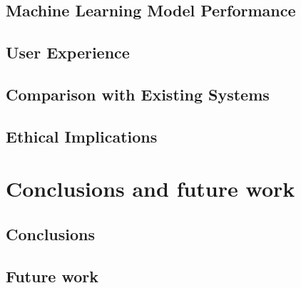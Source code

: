       \subsection{Machine Learning Model Performance}
    
      \subsection{User Experience}
    
      \subsection{Comparison with Existing Systems}
    
      \subsection{Ethical Implications}
    
    
    \section{Conclusions and future work} %
      \subsection{Conclusions}
      
      \subsection{Future work}
    
    
    \printbibliography[title={References},heading=bibintoc] %
    
    
    
